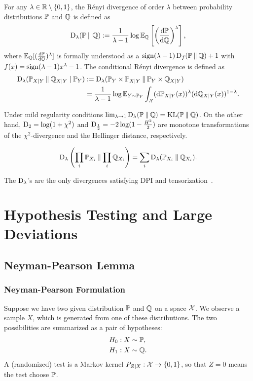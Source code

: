 \begin{definition}
    For any $\lambda\in\mathbb{R}\setminus\{0,1\}$, the R\'{e}nyi divergence of order $\lambda$ between probability distributions $\mathbb{P}$ and $\mathbb{Q}$ is defined as 
    \[\operatorname{D}_\lambda(\mathbb{P}\mathbin{\|}\mathbb{Q}):=\frac{1}{\lambda-1}\log\mathbb{E}_{\mathbb{Q}} \left[\left(\frac{\mathrm{d}\mathbb{P}}{\mathrm{d}\mathbb{Q}}\right)^\lambda\right],\]
    where $\mathbb{E}_{\mathbb{Q}} [(\frac{\mathrm{d}\mathbb{P}}{\mathrm{d}\mathbb{Q}})^\lambda]$ is formally understood as a $\mathop\mathrm{sign}(\lambda-1)\operatorname{D}_f(\mathbb{P}\mathbin{\|}\mathbb{Q})+1$ with $f(x)=\mathop\mathrm{sign}(\lambda-1)x^\lambda-1$.
    The conditional R\'{e}nyi divergence is defined as 
\begin{align*}
    \operatorname{D}_\lambda(\mathbb{P}_{X|Y}\mathbin{\|}\mathbb{Q}_{X|Y}\mid \mathbb{P}_Y)&:=\operatorname{D}_\lambda (\mathbb{P}_Y\times \mathbb{P}_{X|Y}\mathbin{\|} \mathbb{P}_Y\times \mathbb{Q}_{X|Y})\\
    &=\frac{1}{\lambda-1}\log\mathbb{E}_{Y\sim\mathbb{P}_Y}\int_{\mathcal{X}} (\mathrm{d}\mathbb{P}_{X|Y}(x))^\lambda(\mathrm{d}\mathbb{Q}_{X|Y}(x))^{1-\lambda}.
\end{align*}
\end{definition}
\begin{example}
    Under mild regularity conditions $\lim_{\lambda\to 1}\operatorname{D}_\lambda(\mathbb{P}\mathbin{\|}\mathbb{Q})=\operatorname{KL}(\mathbb{P}\mathbin{\|}\mathbb{Q})$.
    On the other hand, $\operatorname{D}_2=\log(1+\chi^2)$ and $\operatorname{D}_{\frac{1}{2}}=-2\log(1-\frac{H^2}{2})$ are monotone transformations of the $\chi^2$-divergence and the Hellinger distance, respectively.
\end{example}

\begin{proposition}
    \[\operatorname{D}_\lambda\left(\prod_i\mathbb{P}_{X_i}\mathbin{\|}\prod_i\mathbb{Q}_{X_i}\right)=\sum_i\operatorname{D}_\lambda(\mathbb{P}_{X_i}\mathbin{\|}\mathbb{Q}_{X_i}).\]
\end{proposition}
\begin{remark}
    The $\operatorname{D}_\lambda$'s are the only divergences satisfying DPI and tensorization~\citep{mu2021blackwell}.
\end{remark}


\chapter{Hypothesis Testing and Large Deviations}

\section{Neyman-Pearson Lemma}

\subsection{Neyman-Pearson Formulation}
Suppose we have two given distribution $\mathbb{P}$ and $\mathbb{Q}$ on a space $\mathcal{X}$.
We observe a sample $X$, which is generated from one of these distributions.
The two possibilities are summarized as a pair of hypotheses:
\begin{align*}
    &H_0:X\sim \mathbb{P}, \\
    &H_1:X\sim \mathbb{Q}.
\end{align*}
A (randomized) test is a Markov kernel $P_{Z|X}:\mathcal{X}\to\{0,1\}$, so that $Z=0$ means the test choose $\mathbb{P}$.

